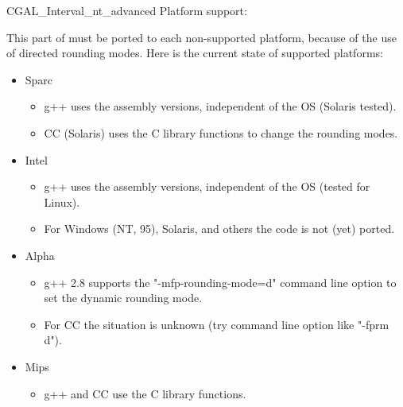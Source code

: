 \begin{ccAdvanced}
\begin{ccClass} {CGAL_Interval_nt_advanced}
Platform support:

This part of {\cgal} must be ported to each non-supported platform, because
of the use of directed rounding modes.  
Here is the current state of supported platforms:

\begin{itemize}
\item Sparc
\begin{itemize}
\item g++ uses the assembly versions, independent of the OS (Solaris tested).
\item CC (Solaris) uses the C library functions to change the rounding modes.
\end{itemize}
\item Intel
\begin{itemize}
\item g++ uses the assembly versions, independent of the OS (tested for Linux).
\item For Windows (NT, 95), Solaris, and others the code is not (yet) ported.
\end{itemize}
\item Alpha
\begin{itemize}
\item g++ 2.8 supports the "-mfp-rounding-mode=d" command line option
      to set the dynamic rounding mode.
\item For CC the situation is unknown (try command line option like "-fprm d").
\end{itemize}
\item Mips
\begin{itemize}
\item g++ and CC use the C library functions.
\end{itemize}
\end{itemize}






\end{ccClass}

\end{ccAdvanced}
